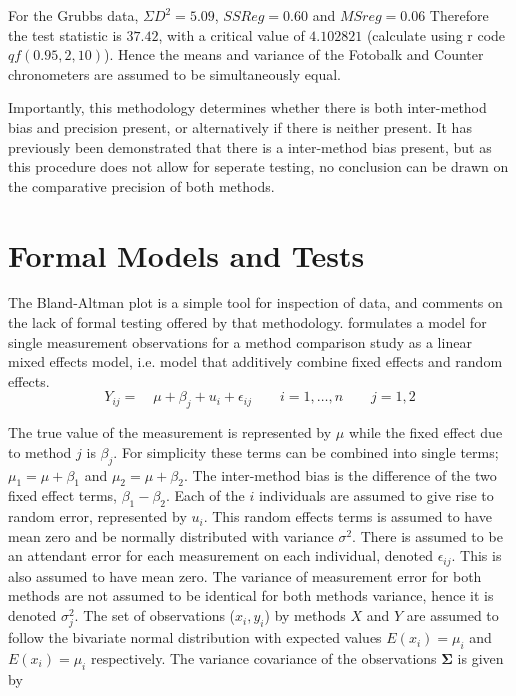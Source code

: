 \documentclass[12pt, a4paper]{article}
\begin{document}
	
	
	
	For the Grubbs data, $\Sigma D^{2}=5.09 $, $SSReg = 0.60$ and
	$MSreg=0.06$ Therefore the test statistic is $37.42$, with a
	critical value of $4.102821$ (calculate using r code
	$qf(0.95,2,10)$). Hence the means and variance of the Fotobalk and
	Counter chronometers are assumed to be simultaneously equal.
	
	Importantly, this methodology determines whether there is both
	inter-method bias and precision present, or alternatively if there
	is neither present. It has previously been demonstrated that there
	is a inter-method bias present, but as this procedure does not
	allow for seperate testing, no conclusion can be drawn on the
	comparative precision of both methods.
	
	
	\newpage
	\section{Formal Models and Tests}
	The Bland-Altman plot is a simple tool for inspection of data, and
	\citet{Kinsella} comments on the lack of formal testing offered by
	that methodology. \citet{Kinsella} formulates a model for
	single measurement observations for a method comparison study as a
	linear mixed effects model, i.e. model that additively combine
	fixed effects and random effects.
	\[
	Y_{ij} =\quad \mu + \beta_{j} + u_{i} + \epsilon_{ij} \qquad i = 1,\dots,n
	\qquad j=1,2\]
	
	The true value of the measurement is represented by $\mu$ while the fixed effect due to method $j$ is $\beta_{j}$.
	For simplicity these terms can be combined into single terms; $\mu_{1} = \mu+ \beta_{1}$ and $\mu_{2} = \mu + \beta_{2}$. The inter-method bias is the difference of the two fixed effect terms, $\beta_{1}-\beta_{2}$. Each of the $i$ individuals are assumed to give rise to random error, represented by $u_{i}$. This random effects terms is assumed to have mean zero and be normally distributed with variance $\sigma^2$. There is assumed to be an attendant error for each measurement on each individual, denoted $\epsilon_{ij}$. This is also assumed to have mean zero. The variance of measurement error for both methods are not assumed to be identical for both methods variance,  hence it is denoted $\sigma^2_{j}$. The set of observations ($x_{i},y_{i}$) by methods $X$ and $Y$ are assumed to follow the bivariate normal distribution with expected values $E(x_{i})= \mu_{i}$ and $E(x_{i})= \mu_{i}$ respectively. The variance covariance of the observations $\boldsymbol{\Sigma}$ is given by
	
\end{document}
